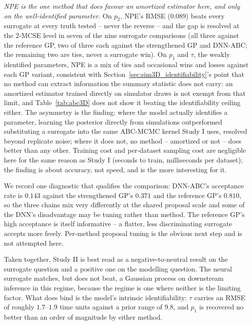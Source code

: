 \documentclass[sn-basic,iicol,pdflatex]{sn-jnl}
\begin{document}
\emph{NPE is the one method that does favour an amortized estimator here, and
only on the well-identified parameter.} On $p_2$, NPE's RMSE ($0.089$) beats
every surrogate at every truth tested -- never the reverse -- and the gap is
resolved at the $2$-MCSE level in seven of the nine surrogate comparisons
(all three against the reference GP, two of three each against the
strengthened GP and DNN-ABC; the remaining two are ties, never a surrogate
win). On $p_1$ and $\tau$, the weakly identified parameters, NPE is a mix of
ties and occasional wins and losses against each GP variant, consistent with
Section~\ref{sec:sim3D_identifiability}'s point that no method can extract
information the summary statistic does not carry: an amortized estimator
trained directly on simulator draws is not exempt from that limit, and
Table~\ref{tab:abc3D} does not show it beating the identifiability ceiling
either. The asymmetry is the finding: where the model actually identifies a
parameter, learning the posterior directly from simulations outperformed
substituting a surrogate into the same ABC-MCMC kernel Study I uses,
resolved beyond replicate noise; where it does not, no method -- amortized or
not -- does better than any other. Training cost and per-dataset sampling
cost are negligible here for the same reason as Study I (seconds to train,
milliseconds per dataset); the finding is about accuracy, not speed, and is
the more interesting for it.

We record one diagnostic that qualifies the comparison: DNN-ABC's acceptance
rate is $0.143$ against the strengthened GP's $0.371$ and the reference GP's
$0.810$, so the three chains mix very differently at the shared proposal scale
and some of the DNN's disadvantage may be tuning rather than method. The
reference GP's high acceptance is itself informative -- a flatter, less
discriminating surrogate accepts more freely. Per-method proposal tuning is the
obvious next step and is not attempted here.

Taken together, Study II is best read as a negative-to-neutral result on the
surrogate question and a positive one on the modelling question. The neural
surrogate matches, but does not beat, a Gaussian process on downstream inference
in this regime, because the regime is one where neither is the limiting factor.
What does bind is the model's intrinsic identifiability: $\tau$ carries an RMSE
of roughly $1.7$--$1.9$ time units against a prior range of $9.8$, and $p_1$ is
recovered no better than an order of magnitude by either method.
\end{document}

